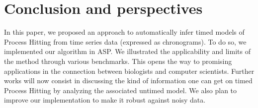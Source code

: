 \section{Conclusion and perspectives}
\label{sec:conclusion}

In this paper, we proposed an approach to automatically infer timed models of Process Hitting from time series data (expressed as chronograms). To do so, we implemented our algorithm in ASP. We illustrated the applicability and limits of the method through various benchmarks. This opens the way to promising applications in the connection between biologists and computer scientists. Further works will now consist in discussing the kind of information one can get on timed Process Hitting by analyzing the associated untimed model. We also plan to improve our implementation to make it robust against noisy data.  

